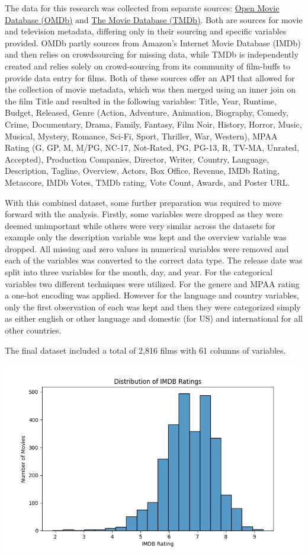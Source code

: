 \documentclass[
]{agujournal2019}
\begin{document}
The data for this research was collected from separate sources:
\href{https://www.omdbapi.com/}{Open Movie Database (OMDb)} and
\href{https://www.themoviedb.org/}{The Movie Database (TMDb)}. Both are
sources for movie and television metadata, differing only in their
sourcing and specific variables provided. OMDb partly sources from
Amazon's Internet Movie Database (IMDb) and then relies on crowdsourcing
for missing data, while TMDb is independently created and relies solely
on crowd-sourcing from its community of film-buffs to provide data entry
for films. Both of these sources offer an API that allowed for the
collection of movie metadata, which was then merged using an inner join
on the film Title and resulted in the following variables: Title, Year,
Runtime, Budget, Released, Genre (Action, Adventure, Animation,
Biography, Comedy, Crime, Documentary, Drama, Family, Fantasy, Film
Noir, History, Horror, Music, Musical, Mystery, Romance, Sci-Fi, Sport,
Thriller, War, Western), MPAA Rating (G, GP, M, M/PG, NC-17, Not-Rated,
PG, PG-13, R, TV-MA, Unrated, Accepted), Production Companies, Director,
Writer, Country, Language, Description, Tagline, Overview, Actors, Box
Office, Revenue, IMDb Rating, Metascore, IMDb Votes, TMDb rating, Vote
Count, Awards, and Poster URL.

With this combined dataset, some further preparation was required to
move forward with the analysis. Firstly, some variables were dropped as
they were deemed unimportant while others were very similar across the
datasets for example only the description variable was kept and the
overview variable was dropped. All missing and zero values in numerical
variables were removed and each of the variables was converted to the
correct data type. The release date was split into three variables for
the month, day, and year. For the categorical variables two different
techniques were utilized. For the genere and MPAA rating a one-hot
encoding was applied. However for the language and country variables,
only the first observation of each was kept and then they were
categorized simply as either english or other language and domestic (for
US) and international for all other countries.

The final dataset included a total of 2,816 films with 61 columns of
variables.

\includegraphics{./notebooks/notebook_output/imdb_rating.png}
\end{document}
